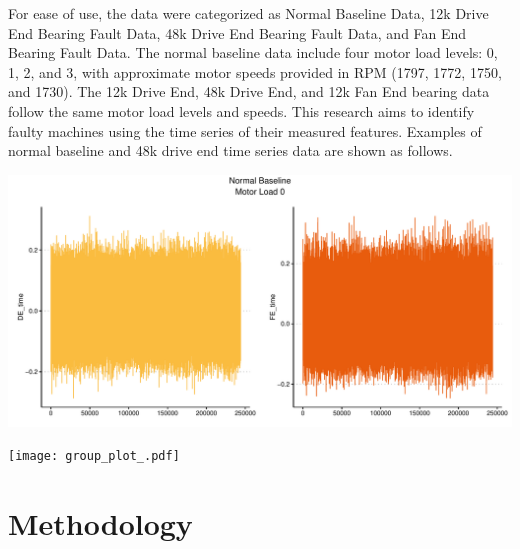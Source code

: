 \documentclass[a0,portrait]{a0poster}
\begin{document}
\begin{mdframed}[style=MyFrame]
\begin{multicols}{2}
For ease of use, the data were categorized as Normal Baseline Data, 12k Drive End Bearing Fault Data, 48k Drive End Bearing Fault Data, and Fan
End Bearing Fault Data. The normal baseline data include four motor load levels: 0, 1, 2, and 3, with approximate motor speeds provided in RPM
(1797, 1772, 1750, and 1730). The 12k Drive End, 48k Drive End, and 12k Fan End bearing data follow the same motor load levels and speeds. This
research aims to identify faulty machines using the time series of their measured features.
Examples of normal baseline and 48k drive end time series data are shown as follows.
%
\vspace{1cm}
\begin{minipage}{\columnwidth}
    \includegraphics[width=0.9\columnwidth]{group_plot_normal.pdf}
\end{minipage}
\vspace{1cm} %

\begin{minipage}{\columnwidth}
    \texttt{[image: group\_plot\_.pdf]}
\end{minipage}

\section{Methodology}\label{section2}


\end{multicols}
\end{mdframed}
\end{document}

